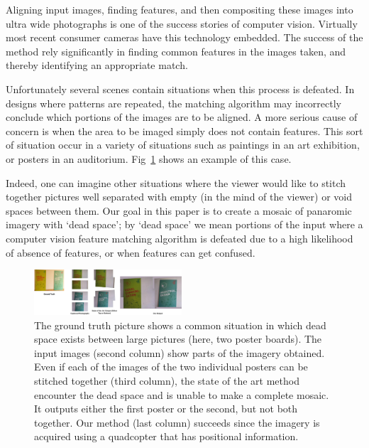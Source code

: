 \documentclass[10pt,twocolumn,letterpaper]{article}
\begin{document}
Aligning input images, finding features, and then compositing these
images into ultra wide photographs is one of the success stories of
computer vision.  Virtually most recent consumer cameras have this
technology embedded.  The success of the method rely significantly in
finding common features in the images taken, and thereby identifying an
appropriate match.

Unfortunately several scenes contain situations when this process is
defeated.  In designs where patterns are repeated, the matching
algorithm may incorrectly conclude which portions of the images are to
be aligned. 
A more serious cause of concern is when the area to be imaged simply
does not contain features.  This sort of situation occur in a variety
of situations such as paintings in an art exhibition, or posters in an
auditorium.  Fig~\ref{fig:teaser} shows an example of this
case. 

Indeed, one can imagine other situations where the viewer would like
to stitch together pictures well separated with empty (in the mind of
the viewer) or void spaces between them.  Our goal in this paper is to
create a mosaic of panaromic imagery with `dead space';
by `dead space' we mean portions of the input where a computer vision
feature matching algorithm is defeated due to a high likelihood of
absence of features, or when features can get confused.

\begin{figure}[t!]
  \centering
  \includegraphics[width=0.49\textwidth]{figures/teaser2}
  \caption{ \label{fig:teaser} The ground truth picture shows a common
    situation in which dead space exists between large pictures (here,
    two poster boards). The input images (second column) show parts of
    the imagery obtained. Even if each of the images of the two
    individual posters can be stitched together (third column), the
    state of the art method encounter the dead space and is unable to
    make a complete mosaic.  It outputs either the first poster or the
    second, but not both together.  Our method (last column) succeeds
    since the imagery is acquired using a quadcopter that has
    positional information.}
\end{figure}
\end{document}
